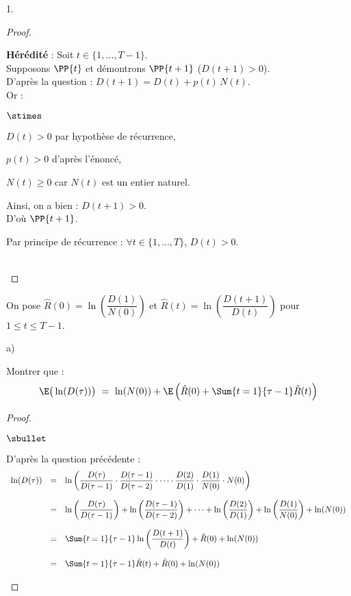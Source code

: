 \documentclass[11pt]{article}%
\begin{document}
\begin{noliste}{1.}
\begin{proof}
\begin{remark}
\begin{noliste}{\fitem}
        \item {\bf Hérédité} : Soit $t\in \{1, \ldots, T-1\}$.\\
        Supposons $\PP{t}$ et démontrons $\PP{t+1}$ (\ie $D(t+1)
        >0$).\\
        D'après la question  : $D(t+1) = D(t) + p(t) \, 
        N(t)$.\\
        Or :
        \begin{noliste}{$\stimes$}
	  \item $D(t) >0$ par hypothèse de récurrence,
	  \item $p(t)>0$ d'après l'énoncé,
	  \item $N(t) \geq 0$ car $N(t)$ est un entier naturel.
        \end{noliste}
        Ainsi, on a bien : $D(t+1) >0$.\\
        D'où $\PP{t+1}$.
      \end{noliste}
      Par principe de récurrence : $\forall t \in \{1, \ldots, T\}$,
      $D(t) >0$.
    \end{remark}~\\[-1.4cm]
  \end{proof}
  
  
  
  \noindent
  On pose $\hat{R}(0) = \ln \left( \dfrac{D(1)}{N(0)}\right)$ et 
  $\hat{R}(t) = \ln \left( \dfrac{D(t+1)}{D(t)}\right)$ pour $1 \leq t 
  \leq T-1$.
  
  \item 
  \begin{noliste}{a)}
    \setlength{\itemsep}{2mm}
    \item Montrer que :
    \[
      \E\big(\ln(D(\tau))\big) \ = \ \ln(N(0)) + \E\left( \hat{R}(0)
      + \Sum{t=1}{\tau -1} \hat{R}(t)\right)
    \]
    
    \begin{proof}~
      \begin{noliste}{$\sbullet$}
	\item D'après la question précédente : 
	\[
	  \begin{array}{rcl}
	    \ln(D(\tau)) &=& \ln \left( \dfrac{D(\tau)}{D(\tau -1)}
	    \cdot \dfrac{D(\tau-1)}{D(\tau -2)} \cdot \cdots \cdot
	    \dfrac{D(2)}{D(1)} \cdot \dfrac{D(1)}{N(0)} \cdot N(0)
	    \right)
	    \\[.6cm]
	    &=& \ln\left( \dfrac{D(\tau)}{D(\tau -1)}\right) + 
	    \ln\left(\dfrac{D(\tau-1)}{D(\tau-2)}\right) +
	    \cdots + \ln\left(\dfrac{D(2)}{D(1)}\right) + 
	    \ln\left(\dfrac{D(1)}{N(0)}\right) + \ln(N(0))
	    \\[.6cm]
	    &=& \Sum{t=1}{\tau-1} \ln \left(\dfrac{D(t+1)}{D(t)}\right)
	    + \hat{R}(0) + \ln(N(0))
	    \\[.6cm]
	    &=& \Sum{t=1}{\tau-1} \hat{R}(t) + \hat{R}(0) + \ln(N(0))
	  \end{array}
	\]
	

\end{noliste}
\end{proof}
\end{noliste}
\end{noliste}
\end{document}
